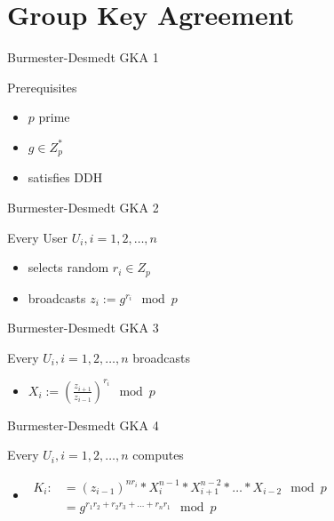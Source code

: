 \section{Group Key Agreement}
\begin{frame}{Burmester-Desmedt GKA 1}
	\begin{block}{Prerequisites}
		\begin{itemize}
			\item $p$ prime
			\item $g \in Z_p^*$
			\item satisfies DDH
		\end{itemize}
	\end{block}
\end{frame}

\begin{frame}{Burmester-Desmedt GKA 2}
	\begin{block}{Every User $U_i, i = 1, 2, \dots, n$}
		\begin{itemize}
			\item selects random $r_i \in Z_p$
			\item broadcasts $z_i := g^{r_i} \mod p$
		\end{itemize}
	\end{block}
\end{frame}

\begin{frame}{Burmester-Desmedt GKA 3}
	\begin{block}{Every $U_i, i = 1, 2, \dots, n$ broadcasts}
		\begin{itemize}
			\item[] $X_i := (\frac{z_{i+1}}{z_{i-1}})^{r_i} \mod p$
		\end{itemize}
	\end{block}
\end{frame}

\begin{frame}{Burmester-Desmedt GKA 4}
	\begin{block}{Every $U_i, i = 1, 2, \dots, n$ computes}
		\begin{itemize}
			\item[] $\begin{aligned}
				K_i :&= (z_{i-1})^{nr_i} * X_i^{n-1} * X_{i+1}^{n-2} * \dots * X_{i-2} \mod p\\
					&= g^{r_1r_2 + r_2r_3 + \dots + r_nr_1} \mod p
			\end{aligned}$
		\end{itemize}
	\end{block}
\end{frame}

